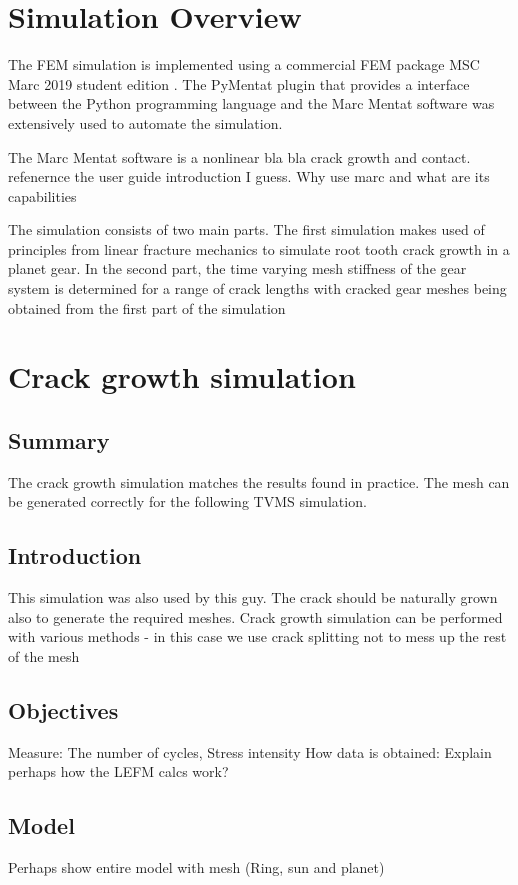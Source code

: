 \section{Simulation Overview}
The FEM simulation is implemented using a commercial FEM package MSC Marc 2019 student edition \cite{MSCMarc2019}. The PyMentat plugin \cite{Marc_Py2003} that provides a interface between the Python programming language and the Marc Mentat software was extensively used to automate the simulation. 

The Marc Mentat software  is a nonlinear bla bla crack growth and contact. refenernce the user guide introduction I guess. Why use marc and what are its capabilities

The simulation consists of two main parts. The first simulation makes used of principles from linear fracture mechanics to simulate root tooth crack growth in a planet gear. In the second part, the time varying mesh stiffness of the gear system is determined for a range of crack lengths with cracked gear meshes being obtained from the first part of the simulation


\section{Crack growth simulation}

\subsection{Summary}
The crack growth simulation matches the results found in practice. The mesh can be generated correctly for the following TVMS simulation.

\subsection{Introduction}
This simulation was also used by this guy. 
The crack should be naturally grown also to generate the required meshes.
Crack growth simulation can be performed with various methods - in this case we use crack splitting not to mess up the rest of the mesh

\subsection{Objectives}
Measure: The number of cycles, Stress intensity
How data is obtained: Explain perhaps how the LEFM calcs work?

\subsection{Model}
Perhaps show entire model with mesh (Ring, sun and planet)

